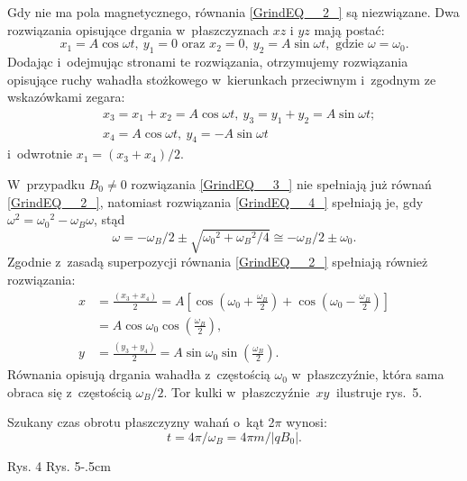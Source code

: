 {\begin{dwieszpalty}
Gdy nie ma pola magnetycznego, równania \eqref{GrindEQ__2_} są niezwiązane. Dwa rozwiązania opisujące drgania w~płaszczyznach $xz$ i $yz$ mają postać:
\begin{equation}
  \label{GrindEQ__3_}x_1=A\cos \omega t,\  y_1=0\text{  oraz  }x_2=0,\  y_2=A\sin\omega t,\text{   gdzie }\omega ={\omega }_0.
\end{equation}
Dodając i~odejmując stronami te rozwiązania, otrzymujemy rozwiązania opisujące ruchy wahadła stożkowego w~kierunkach przeciwnym i~zgodnym ze wskazówkami zegara:
\begin{equation} \label{GrindEQ__4_} \begin{aligned}
                       &
x_3=x_1+x_2=A\cos \omega t,\  y_3=y_1+y_2=A\sin \omega t;\\& x_4=A\cos \omega t,\  y_4=-A\sin\omega t 
                                     \end{aligned}
                                   \end{equation} 
i~odwrotnie $x_1={\left(x_3+x_4\right)}/{2}$.

W~przypadku $B_0\neq 0$ rozwiązania \eqref{GrindEQ__3_} nie spełniają już równań \eqref{GrindEQ__2_}, natomiast  rozwiązania \eqref{GrindEQ__4_}  spełniają je, gdy ${\omega }^2={{\omega }_0}^2-{\omega }_B\omega $, stąd
\[\omega =-{{\omega }_B}/{2}\pm \sqrt{{{\omega }_0}^2+{{{\omega }_B}^2}/{4}}\cong -{{\omega }_B}/{2}\pm {\omega }_0.\] 
Zgodnie z~zasadą superpozycji równania \eqref{GrindEQ__2_} spełniają również rozwiązania:
\begin{align*}
  x&=\frac{\left(x_3+x_4\right)}{2}=A\left[\cos \left({\omega }_0+\frac{{\omega }_B}{2}\right)+\cos \left({\omega }_0-\frac{{\omega }_B}{2}\right)\right]\\&=A\cos {\omega }_0\cos \left(\frac{{\omega }_B}{2}\right),\\
y&=\frac{\left(y_3+y_4\right)}{2}=A\sin {\omega }_0\sin \left(\frac{{\omega }_B}{2}\right).
\end{align*}
Równania opisują drgania wahadła z~częstością ${\omega }_0$ w~płaszczyźnie, która sama obraca się z~częstością ${{\omega }_B}/{2}$. Tor kulki w~płaszczyźnie~$xy\ $ ilustruje rys.~5.

Szukany czas obrotu płaszczyzny wahań o~kąt 2$\pi $ wynosi:
\[t={4\pi }/{{\omega }_B}={4\pi m}/{\left|qB_0\right|}.\] 
{
  \scriptsize
  Rys. 4\rysd
\hskip2cm
  Rys. 5\kern-.5cm
\ryse

}\end{dwieszpalty}
}


